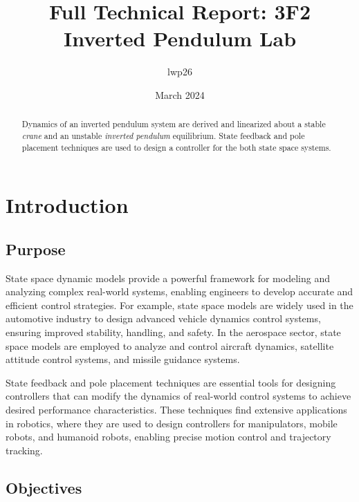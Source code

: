 \documentclass{article}
\begin{document}
\title{Full Technical Report: 3F2 Inverted Pendulum Lab}
\author{lwp26}
\date{March 2024}
\maketitle 

\begin{abstract}
    \centering
    Dynamics of an inverted pendulum system are derived and linearized about a stable \textit{crane} and an unstable \textit{inverted pendulum} equilibrium. State feedback and pole placement techniques are used to design a controller for the both state space systems.
\end{abstract}

\section{Introduction}

\subsection{Purpose}

State space dynamic models provide a powerful framework for modeling and analyzing complex real-world systems, enabling engineers to develop accurate and efficient control strategies. For example, state space models are widely used in the automotive industry to design advanced vehicle dynamics control systems, ensuring improved stability, handling, and safety. In the aerospace sector, state space models are employed to analyze and control aircraft dynamics, satellite attitude control systems, and missile guidance systems.

State feedback and pole placement techniques are essential tools for designing controllers that can modify the dynamics of real-world control systems to achieve desired performance characteristics. These techniques find extensive applications in robotics, where they are used to design controllers for manipulators, mobile robots, and humanoid robots, enabling precise motion control and trajectory tracking.

\subsection{Objectives}
\end{document}
